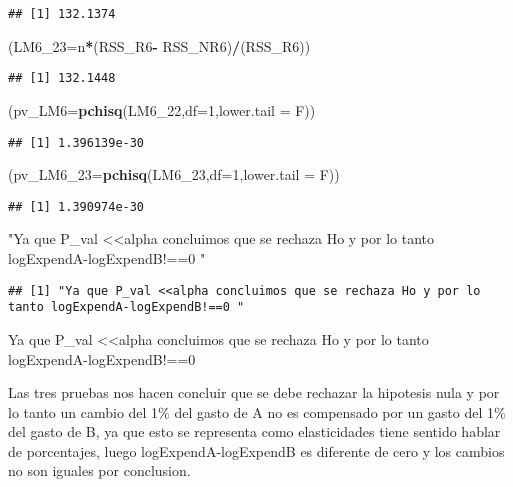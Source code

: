 \documentclass[
]{article}
\newenvironment{Shaded}{\begin{snugshade}}{\end{snugshade}}
\newcommand{\DataTypeTok}[1]{\textcolor[rgb]{0.13,0.29,0.53}{#1}}
\newcommand{\DecValTok}[1]{\textcolor[rgb]{0.00,0.00,0.81}{#1}}
\newcommand{\KeywordTok}[1]{\textcolor[rgb]{0.13,0.29,0.53}{\textbf{#1}}}
\newcommand{\NormalTok}[1]{#1}
\newcommand{\OperatorTok}[1]{\textcolor[rgb]{0.81,0.36,0.00}{\textbf{#1}}}
\newcommand{\StringTok}[1]{\textcolor[rgb]{0.31,0.60,0.02}{#1}}
\begin{document}
\begin{verbatim}
## [1] 132.1374
\end{verbatim}

\begin{Shaded}
\begin{Highlighting}[]
\NormalTok{(}\DataTypeTok{LM6_23=}\NormalTok{n}\OperatorTok{*}\NormalTok{(RSS_R6}\OperatorTok{-}\StringTok{ }\NormalTok{RSS_NR6)}\OperatorTok{/}\NormalTok{(RSS_R6))}
\end{Highlighting}
\end{Shaded}

\begin{verbatim}
## [1] 132.1448
\end{verbatim}

\begin{Shaded}
\begin{Highlighting}[]
\NormalTok{(}\DataTypeTok{pv_LM6=}\KeywordTok{pchisq}\NormalTok{(LM6_}\DecValTok{22}\NormalTok{,}\DataTypeTok{df=}\DecValTok{1}\NormalTok{,}\DataTypeTok{lower.tail =}\NormalTok{ F))}
\end{Highlighting}
\end{Shaded}

\begin{verbatim}
## [1] 1.396139e-30
\end{verbatim}

\begin{Shaded}
\begin{Highlighting}[]
\NormalTok{(}\DataTypeTok{pv_LM6_23=}\KeywordTok{pchisq}\NormalTok{(LM6_}\DecValTok{23}\NormalTok{,}\DataTypeTok{df=}\DecValTok{1}\NormalTok{,}\DataTypeTok{lower.tail =}\NormalTok{ F))}
\end{Highlighting}
\end{Shaded}

\begin{verbatim}
## [1] 1.390974e-30
\end{verbatim}

\begin{Shaded}
\begin{Highlighting}[]
\StringTok{"Ya que P_val <<alpha concluimos que se rechaza Ho y por lo tanto logExpendA-logExpendB!==0 "}
\end{Highlighting}
\end{Shaded}

\begin{verbatim}
## [1] "Ya que P_val <<alpha concluimos que se rechaza Ho y por lo tanto logExpendA-logExpendB!==0 "
\end{verbatim}

Ya que P\_val \textless\textless alpha concluimos que se rechaza Ho y
por lo tanto logExpendA-logExpendB!==0

Las tres pruebas nos hacen concluir que se debe rechazar la hipotesis
nula y por lo tanto un cambio del 1\% del gasto de A no es compensado
por un gasto del 1\% del gasto de B, ya que esto se representa como
elasticidades tiene sentido hablar de porcentajes, luego
logExpendA-logExpendB es diferente de cero y los cambios no son iguales
por conclusion.
\end{document}
